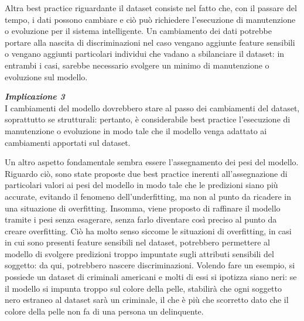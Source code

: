 Altra best practice riguardante il dataset consiste nel fatto che, con il passare del tempo, i dati possono cambiare e ciò può richiedere l'esecuzione di manutenzione o evoluzione per il sistema intelligente. Un cambiamento dei dati potrebbe portare alla nascita di discriminazioni nel caso vengano aggiunte feature sensibili o vengano aggiunti particolari individui che vadano a sbilanciare il dataset: in entrambi i casi, sarebbe necessario svolgere un minimo di manutenzione o evoluzione sul modello.

\begin{center}
    \begin{tcolorbox}[width=400pt, colframe=black, colback=Gray!10]
			\begin{minipage}{\textwidth}
				\textit{\faCaretSquareORight  \textbf{ Implicazione 3}}\\
		     I cambiamenti del modello dovrebbero stare al passo dei cambiamenti del dataset, soprattutto se strutturali: pertanto, è considerabile best practice l'esecuzione di manutenzione o evoluzione in modo tale che il modello venga adattato ai cambiamenti apportati sul dataset.
			\end{minipage}
	\end{tcolorbox}
\end{center}

Un altro aspetto fondamentale sembra essere l'assegnamento dei pesi del modello. Riguardo ciò, sono state proposte due best practice inerenti all'assegnazione di particolari valori ai pesi del modello in modo tale che le predizioni siano più accurate, evitando il fenomeno dell'underfitting, ma non al punto da ricadere in una situazione di overfitting. Insomma, viene proposto di raffinare il modello tramite i pesi senza esagerare, senza farlo diventare così preciso al punto da creare overfitting. Ciò ha molto senso siccome le situazioni di overfitting, in casi in cui sono presenti feature sensibili nel dataset, potrebbero permettere al modello di svolgere predizioni troppo impuntate sugli attributi sensibili del soggetto: da qui, potrebbero nascere discriminazioni. Volendo fare un esempio, si possiede un dataset di criminali americani e molti di essi si ipotizza siano neri: se il modello si impunta troppo sul colore della pelle, stabilirà che ogni soggetto nero estraneo al dataset sarà un criminale, il che è più che scorretto dato che il colore della pelle non fa di una persona un delinquente.

